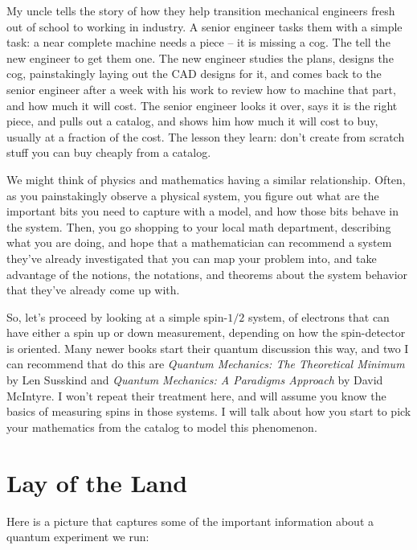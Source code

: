 \documentclass[
]{book}
\begin{document}
My uncle tells the story of how they help transition mechanical engineers fresh out of school to working in industry. A senior engineer tasks them with a simple task: a near complete machine needs a piece -- it is missing a cog. The tell the new engineer to get them one. The new engineer studies the plans, designs the cog, painstakingly laying out the CAD designs for it, and comes back to the senior engineer after a week with his work to review how to machine that part, and how much it will cost. The senior engineer looks it over, says it is the right piece, and pulls out a catalog, and shows him how much it will cost to buy, usually at a fraction of the cost. The lesson they learn: don't create from scratch stuff you can buy cheaply from a catalog.

We might think of physics and mathematics having a similar relationship. Often, as you painstakingly observe a physical system, you figure out what are the important bits you need to capture with a model, and how those bits behave in the system. Then, you go shopping to your local math department, describing what you are doing, and hope that a mathematician can recommend a system they've already investigated that you can map your problem into, and take advantage of the notions, the notations, and theorems about the system behavior that they've already come up with.

So, let's proceed by looking at a simple spin-\(1/2\) system, of electrons that can have either a spin up or down measurement, depending on how the spin-detector is oriented. Many newer books start their quantum discussion this way, and two I can recommend that do this are \emph{Quantum Mechanics: The Theoretical Minimum} by Len Susskind and \emph{Quantum Mechanics: A Paradigms Approach} by David McIntyre. I won't repeat their treatment here, and will assume you know the basics of measuring spins in those systems. I will talk about how you start to pick your mathematics from the catalog to model this phenomenon.

\hypertarget{lay-of-the-land}{%
\section{Lay of the Land}\label{lay-of-the-land}}

Here is a picture that captures some of the important information about a quantum experiment we run:
\end{document}
